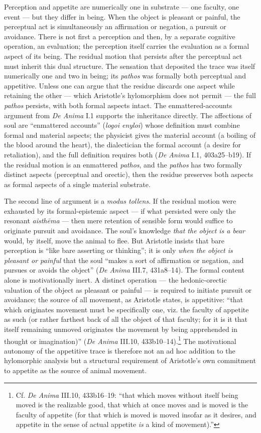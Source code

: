 Perception and appetite are numerically one in substrate --- one faculty, one event --- but they differ in being. When the object is pleasant or painful, the perceptual act is simultaneously an affirmation or negation, a pursuit or avoidance. There is not first a perception and then, by a separate cognitive operation, an evaluation; the perception itself carries the evaluation as a formal aspect of its being. The residual motion that persists after the perceptual act must inherit this dual structure. The sensation that deposited the trace was itself numerically one and two in being; its \textit{pathos} was formally both perceptual and appetitive. Unless one can argue that the residue discards one aspect while retaining the other --- which Aristotle's hylomorphism does not permit --- the full \textit{pathos} persists, with both formal aspects intact. The enmattered-accounts argument from \textit{De Anima} I.1 supports the inheritance directly. The affections of soul are ``enmattered accounts'' (\textit{logoi enyloi}) whose definition must combine formal and material aspects; the physicist gives the material account (a boiling of the blood around the heart), the dialectician the formal account (a desire for retaliation), and the full definition requires both (\textit{De Anima} I.1, 403a25--b19). If the residual motion is an enmattered \textit{pathos}, and the \textit{pathos} has two formally distinct aspects (perceptual and orectic), then the residue preserves both aspects as formal aspects of a single material substrate.

The second line of argument is a \textit{modus tollens}. If the residual motion were exhausted by its formal-epistemic aspect --- if what persisted were only the resonant \textit{aisthēma} --- then mere retention of sensible form would suffice to originate pursuit and avoidance. The soul's knowledge \textit{that the object is a bear} would, by itself, move the animal to flee. But Aristotle insists that bare perception is ``like bare asserting or thinking''; it is only \textit{when the object is pleasant or painful} that the soul ``makes a sort of affirmation or negation, and pursues or avoids the object'' (\textit{De Anima} III.7, 431a8--14). The formal content alone is motivationally inert. A distinct operation --- the hedonic-orectic valuation of the object as pleasant or painful --- is required to initiate pursuit or avoidance; the source of all movement, as Aristotle states, is appetitive: ``that which originates movement must be specifically one, viz. the faculty of appetite as such (or rather farthest back of all the object of that faculty; for it is it that itself remaining unmoved originates the movement by being apprehended in thought or imagination)'' (\textit{De Anima} III.10, 433b10--14).\footnote{Cf. \textit{De Anima} III.10, 433b16--19: ``that which moves without itself being moved is the realizable good, that which at once moves and is moved is the faculty of appetite (for that which is moved is moved insofar as it desires, and appetite in the sense of actual appetite \textit{is} a kind of movement).''} The motivational autonomy of the appetitive trace is therefore not an ad hoc addition to the hylomorphic analysis but a structural requirement of Aristotle's own commitment to appetite as the source of animal movement.

